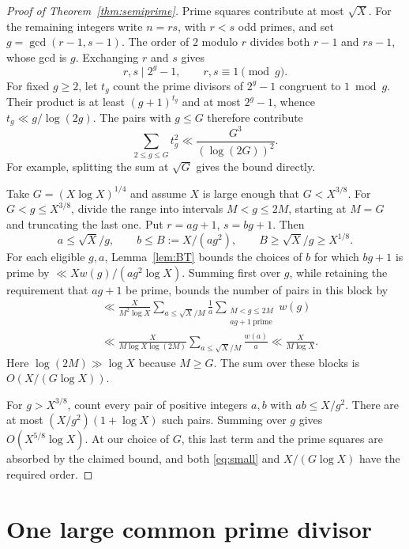 \documentclass[11pt]{article}
\begin{document}
\begin{proof}[Proof of Theorem~\ref{thm:semiprime}]
Prime squares contribute at most \(\sqrt X\). For the remaining
integers write \(n=rs\), with \(r<s\) odd primes, and set
\(g=\gcd(r-1,s-1)\). The order of \(2\) modulo \(r\) divides
both \(r-1\) and \(rs-1\), whose gcd is \(g\). Exchanging \(r\)
and \(s\) gives
\[
                  r,s\mid 2^g-1,\qquad r,s\equiv1\pmod g.
\]
For fixed \(g\ge2\), let \(t_g\) count the prime divisors of
\(2^g-1\) congruent to \(1\bmod g\). Their product is at least
\((g+1)^{t_g}\) and at most \(2^g-1\), whence
\(t_g\ll g/\log(2g)\). The pairs with \(g\le G\) therefore
contribute
\begin{equation}\label{eq:small}
     \sum_{2\le g\le G}t_g^2\ll \frac{G^3}{(\log(2G))^2}.
\end{equation}
For example, splitting the sum at \(\sqrt G\) gives the bound directly.

Take \(G=(X\log X)^{1/4}\) and assume \(X\) is large enough
that \(G<X^{3/8}\). For \(G<g\le X^{3/8}\), divide the range into
intervals \(M<g\le2M\), starting at \(M=G\) and truncating the
last one. Put \(r=ag+1\), \(s=bg+1\). Then
\[
       a\le \sqrt X/g,\qquad b\le B:=X/(ag^2),\qquad
       B\ge \sqrt X/g\ge X^{1/8}.
\]
For each eligible \(g,a\), Lemma~\ref{lem:BT} bounds the choices
of \(b\) for which \(bg+1\) is prime by
\(\ll Xw(g)/(ag^2\log X)\). Summing first over \(g\), while
retaining the requirement that \(ag+1\) be prime, bounds the number
of pairs in this block by
\begin{align*}
   &\ll \frac{X}{M^2\log X}
       \sum_{a\le\sqrt X/M}\frac1a
       \sum_{\substack{M<g\le2M\\ag+1\ \mathrm{prime}}}w(g)\\
   &\ll \frac{X}{M\log X\log(2M)}
               \sum_{a\le\sqrt X/M}\frac{w(a)}a
     \ll \frac{X}{M\log X}.
\end{align*}
Here \(\log(2M)\gg\log X\) because \(M\ge G\). The sum over
these blocks is \(O(X/(G\log X))\).

For \(g>X^{3/8}\), count every pair of positive integers
\(a,b\) with \(ab\le X/g^2\). There are at most
\((X/g^2)(1+\log X)\) such pairs. Summing over \(g\) gives
\(O(X^{5/8}\log X)\). At our choice of \(G\), this last
term and the prime squares are absorbed by the claimed bound,
and both \eqref{eq:small} and \(X/(G\log X)\) have the
required order.
\end{proof}

\section{One large common prime divisor}
\end{document}
